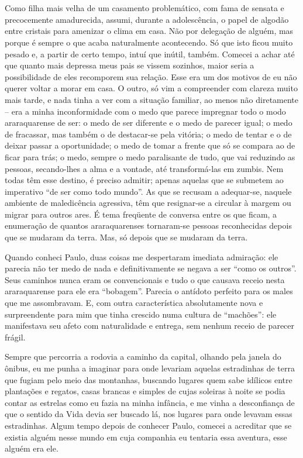 \chapter{}
Como filha mais velha de um casamento problemático, com fama de sensata e precocemente amadurecida, assumi, durante a adolescência, o papel de algodão entre cristais para amenizar o clima em casa.
Não por delegação de alguém, mas porque é sempre o que acaba naturalmente acontecendo.
Só que isto ficou muito pesado e, a partir de certo tempo, intuí que inútil, também.
Comecei a achar até que quanto mais depressa meus pais se vissem sozinhos, maior seria a possibilidade de eles recomporem sua relação.
Esse era um dos motivos de eu não querer voltar a morar em casa.
O outro, só vim a compreender com clareza muito mais tarde, e nada tinha a ver com a situação familiar, ao menos não diretamente – era a minha inconformidade com o medo que parece impregnar todo o modo araraquarense de ser: o medo de ser diferente e o medo de parecer igual; o medo de fracassar, mas também o de destacar-se pela vitória; o medo de tentar e o de deixar passar a oportunidade; o medo de tomar a frente que só se compara ao de ficar para trás; o medo, sempre o medo paralisante de tudo, que vai reduzindo as pessoas, secando-lhes a alma e a vontade, até transformá-las em zumbis.
Nem todas têm esse destino, é preciso admitir; apenas aquelas que se submetem ao imperativo ``de ser como todo mundo''.
As que se recusam a adequar-se, naquele ambiente de maledicência agressiva, têm que resignar-se a circular à margem ou migrar para outros ares.
É tema freqüente de conversa entre os que ficam, a enumeração de quantos araraquarenses tornaram-se pessoas reconhecidas depois que se mudaram da terra.
Mas, só depois que se mudaram da terra.

Quando conheci Paulo, duas coisas me despertaram imediata admiração: ele parecia não ter medo de nada e definitivamente se negava a ser ``como os outros''.
Seus caminhos nunca eram os convencionais e tudo o que causava receio nesta araraquarense para ele era ``bobagem''.
Parecia o antídoto perfeito para os males que me assombravam.
E, com outra característica absolutamente nova e surpreendente para mim que tinha crescido numa cultura de ``machões'': ele manifestava seu afeto com naturalidade e entrega, sem nenhum receio de parecer frágil.

Sempre que percorria a rodovia a caminho da capital, olhando pela janela do ônibus, eu me punha a imaginar para onde levariam aquelas estradinhas de terra que fugiam pelo meio das montanhas, buscando lugares quem sabe idílicos entre plantações e regatos, casas brancas e simples de cujas soleiras à noite se podia contar as estrelas como eu fazia na minha infância, e me vinha a desconfiança de que o sentido da Vida devia ser buscado lá, nos lugares para onde levavam essas estradinhas.
Algum tempo depois de conhecer Paulo, comecei a acreditar que se existia alguém nesse mundo em cuja companhia eu tentaria essa aventura, esse alguém era ele.


